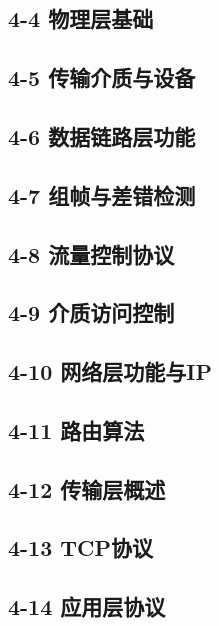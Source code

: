\documentclass[10pt, aspectratio=169]{beamer}
\begin{document}
\subsection{4-4 物理层基础}


\subsection{4-5 传输介质与设备}


\subsection{4-6 数据链路层功能}


\subsection{4-7 组帧与差错检测}


\subsection{4-8 流量控制协议}


\subsection{4-9 介质访问控制}


\subsection{4-10 网络层功能与IP}


\subsection{4-11 路由算法}


\subsection{4-12 传输层概述}


\subsection{4-13 TCP协议}


\subsection{4-14 应用层协议}

\end{document}
